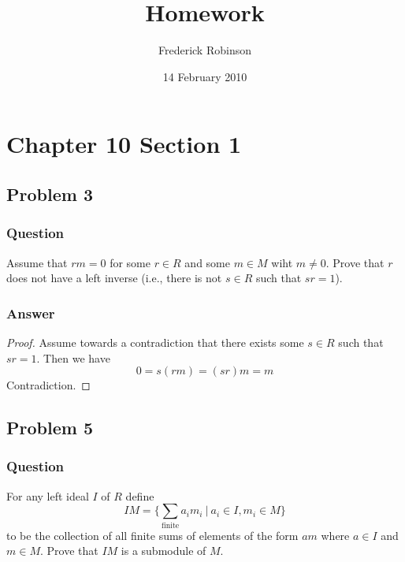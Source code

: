 \documentclass[12pt]{article}
\title{Homework}
\author{Frederick Robinson}
\date{14 February 2010}
\begin{document}

   \maketitle

\setcounter{tocdepth}{2} 

\tableofcontents

\section{Chapter 10 Section 1}
\subsection{Problem 3}

\subsubsection{Question}
Assume that $rm = 0$ for some $ r \in R$ and some $m \in M$ wiht $ m \neq 0$. Prove that $r$ does not have a left inverse (i.e., there is not $ s \in R$ such that $s r =1$).
\subsubsection{Answer}
\begin{proof}
Assume towards a contradiction that there exists some $s \in R $ such that $s r =1$. Then we have 
\[0 = s (r m) =(s r ) m = m \]
Contradiction.\end{proof}

\subsection{Problem 5}

\subsubsection{Question}
For any left ideal $I$ of $R$ define 
\[ I M = \{ \sum_{\mathrm{finite}} a_i m_i \ |\ a_i \in I, m_i \in M \}  \]
to be the collection of all finite sums of elements of the form $am$ where $a \in I$ and $m \in M$. Prove that $IM$ is a submodule of $M$.
\end{document}
